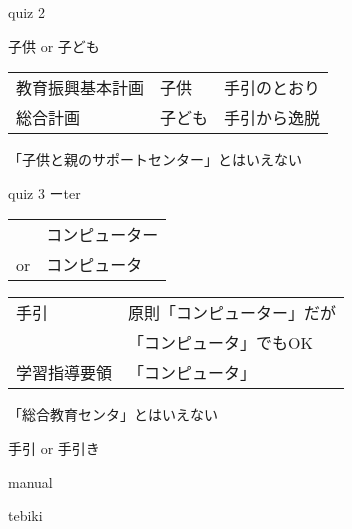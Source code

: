 \documentclass[
  ignorenonframetext,
]{beamer}
\begin{document}
\begin{frame}{quiz 2}
\protect\hypertarget{quiz-2}{}
\Huge

子供 or 子ども \pause

\bigskip

\large

\raggedleft
\begin{tabular}{@{}lll@{}}\toprule
教育振興基本計画&子供&手引のとおり\\\pause
総合計画&子ども&手引から逸脱\\\bottomrule
\end{tabular}
\pause

\vfill

「子供と親のサポートセンター」とはいえない
\end{frame}

\begin{frame}{quiz 3 ーter}
\protect\hypertarget{quiz-3-ux30fcter}{}
\Huge

\begin{tabular}{@{}ll@{}}
&コンピューター\\
or&コンピュータ
\end{tabular}

\pause

\vfill

\large
\raggedleft
\begin{tabular}{@{}ll@{}}\toprule
手引&原則「コンピューター」だが\\
&「コンピュータ」でもOK\\\pause
学習指導要領&「コンピュータ」\\\bottomrule
\end{tabular}
\pause

\vfill

「総合教育センタ」とはいえない
\end{frame}

\begin{frame}{手引 or 手引き}
\protect\hypertarget{ux624bux5f15-or-ux624bux5f15ux304d}{}
\end{frame}

\begin{frame}{manual}
\protect\hypertarget{manual-1}{}
\end{frame}

\begin{frame}{tebiki}
\protect\hypertarget{tebiki}{}
\vspace*{-20pt}
\end{frame}
\end{document}
